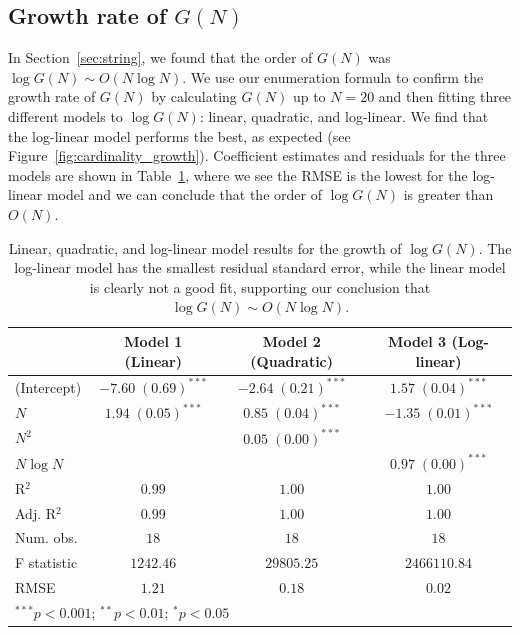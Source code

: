 \documentclass{article}
\begin{document}
\subsection{Growth rate of $G(N)$} 
\label{subsec:cardinality_growth_rate}

In Section~\ref{sec:string}, we found that the order of $G(N)$ was $\log G(N) \sim O(N \log N)$. We use our enumeration formula to confirm the growth rate of $G(N)$ by calculating $G(N)$ up to $N=20$ and then fitting three different models to $\log G(N)$: linear, quadratic, and log-linear. We find that the log-linear model performs the best, as expected (see Figure~\ref{fig:cardinality_growth}). Coefficient estimates and residuals for the three models are shown in Table~\ref{table:cardinality_growth_regression}, where we see the RMSE is the lowest for the log-linear model and we can conclude that the order of $\log G(N)$ is greater than $O(N)$. 

\begin{table}[H]
\begin{center}
\begin{tabular}{l c c c}
\hline
& Model 1 (Linear) & Model 2 (Quadratic) & Model 3 (Log-linear) \\
\hline
(Intercept) & $-7.60 \; (0.69)^{***}$ & $-2.64 \; (0.21)^{***}$ & $1.57 \; (0.04)^{***}$  \\
$N$           & $1.94 \; (0.05)^{***}$  & $0.85 \; (0.04)^{***}$  & $-1.35 \; (0.01)^{***}$ \\
$N^2$         &                         & $0.05 \; (0.00)^{***}$  &                         \\
$N \log N$       &                         &                         & $0.97 \; (0.00)^{***}$  \\
\hline
R$^2$       & $0.99$                  & $1.00$                  & $1.00$                  \\
Adj. R$^2$  & $0.99$                  & $1.00$                  & $1.00$                  \\
Num. obs.   & $18$                    & $18$                    & $18$                    \\
F statistic & $1242.46$               & $29805.25$              & $2466110.84$            \\
RMSE        & $1.21$                  & $0.18$                  & $\mathbf{0.02}$                  \\
\hline
\multicolumn{4}{l}{\scriptsize{$^{***}p<0.001$; $^{**}p<0.01$; $^{*}p<0.05$}}
\end{tabular}
\caption{Linear, quadratic, and log-linear model results for the growth of $\log G(N)$. The log-linear model has the smallest residual standard error, while the linear model is clearly not a good fit, supporting our conclusion that $\log G(N) \sim O(N\log N)$.}
\label{table:cardinality_growth_regression}
\end{center}
\end{table}
\end{document}
